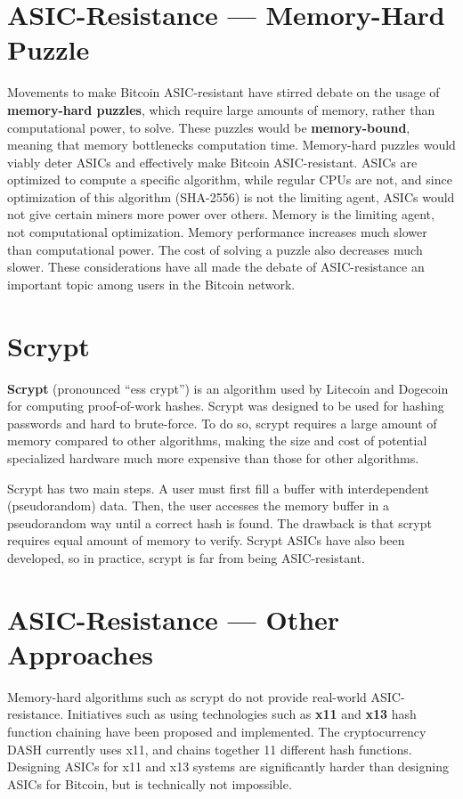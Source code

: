 \documentclass[full.tex]{subfiles}
\begin{document}
    \section*{ASIC-Resistance --- Memory-Hard Puzzle}
    
    Movements to make Bitcoin ASIC-resistant have stirred debate on the usage of \textbf{memory-hard puzzles}, which require large amounts of memory, rather than computational power, to solve. These puzzles would be \textbf{memory-bound}, meaning that memory bottlenecks computation time. Memory-hard puzzles would viably deter ASICs and effectively make Bitcoin ASIC-resistant. ASICs are optimized to compute a specific algorithm, while regular CPUs are not, and since optimization of this algorithm (SHA-2556) is not the limiting agent, ASICs would not give certain miners more power over others. Memory is the limiting agent, not computational optimization. Memory performance increases much slower than computational power. The cost of solving a puzzle also decreases much slower. These considerations have all made the debate of ASIC-resistance an important topic among users in the Bitcoin network.
    
    \section*{Scrypt}
    
    \textbf{Scrypt} (pronounced ``ess crypt'') is an algorithm used by Litecoin and Dogecoin for computing proof-of-work hashes. Scrypt was designed to be used for hashing passwords and hard to brute-force. To do so, scrypt requires a large amount of memory compared to other algorithms, making the size and cost of potential specialized hardware much more expensive than those for other algorithms. 
    
    Scrypt has two main steps. A user must first fill a buffer with interdependent (pseudorandom) data. Then, the user accesses the memory buffer in a pseudorandom way until a correct hash is found. The drawback is that scrypt requires equal amount of memory to verify. Scrypt ASICs have also been developed, so in practice, scrypt is far from being ASIC-resistant.
    
    \section*{ASIC-Resistance --- Other Approaches}
    
    Memory-hard algorithms such as scrypt do not provide real-world ASIC-resistance. Initiatives such as using technologies such as \textbf{x11} and \textbf{x13} hash function chaining have been proposed and implemented. The cryptocurrency DASH currently uses x11, and chains together 11 different hash functions. Designing ASICs for x11 and x13 systems are significantly harder than designing ASICs for Bitcoin, but is technically not impossible.
    
\end{document}
